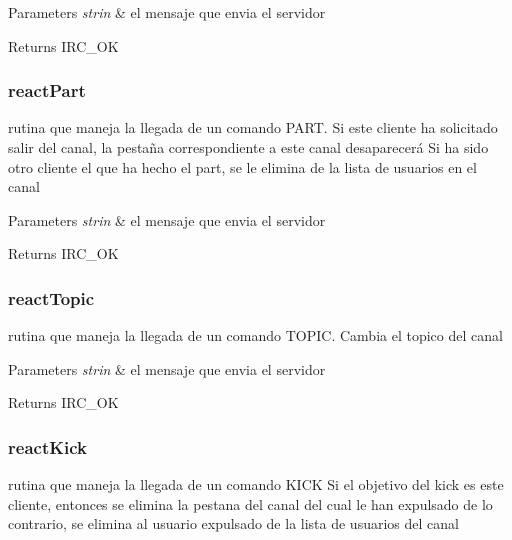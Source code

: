 \begin{DoxyParams}{Parameters}
{\em strin} & el mensaje que envia el servidor\\
\hline
\end{DoxyParams}
\begin{DoxyReturn}{Returns}
I\-R\-C\-\_\-\-O\-K
\end{DoxyReturn}


 \hypertarget{reactPart}{}\subsubsection{react\-Part}\label{reactPart}
rutina que maneja la llegada de un comando P\-A\-R\-T. Si este cliente ha solicitado salir del canal, la pestaña correspondiente a este canal desaparecerá Si ha sido otro cliente el que ha hecho el part, se le elimina de la lista de usuarios en el canal


\begin{DoxyParams}{Parameters}
{\em strin} & el mensaje que envia el servidor\\
\hline
\end{DoxyParams}
\begin{DoxyReturn}{Returns}
I\-R\-C\-\_\-\-O\-K
\end{DoxyReturn}


 \hypertarget{reactTopic}{}\subsubsection{react\-Topic}\label{reactTopic}
rutina que maneja la llegada de un comando T\-O\-P\-I\-C. Cambia el topico del canal


\begin{DoxyParams}{Parameters}
{\em strin} & el mensaje que envia el servidor\\
\hline
\end{DoxyParams}
\begin{DoxyReturn}{Returns}
I\-R\-C\-\_\-\-O\-K
\end{DoxyReturn}


 \hypertarget{reactKick}{}\subsubsection{react\-Kick}\label{reactKick}
rutina que maneja la llegada de un comando K\-I\-C\-K Si el objetivo del kick es este cliente, entonces se elimina la pestana del canal del cual le han expulsado de lo contrario, se elimina al usuario expulsado de la lista de usuarios del canal


